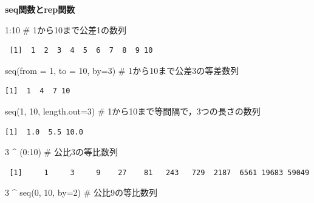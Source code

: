 \documentclass[
  letterpaper,
  DIV=11,
  numbers=noendperiod]{scrreprt}
\newenvironment{Shaded}{\begin{snugshade}}{\end{snugshade}}
\newcommand{\AttributeTok}[1]{\textcolor[rgb]{0.40,0.45,0.13}{#1}}
\newcommand{\CommentTok}[1]{\textcolor[rgb]{0.37,0.37,0.37}{#1}}
\newcommand{\DecValTok}[1]{\textcolor[rgb]{0.68,0.00,0.00}{#1}}
\newcommand{\FunctionTok}[1]{\textcolor[rgb]{0.28,0.35,0.67}{#1}}
\newcommand{\NormalTok}[1]{\textcolor[rgb]{0.00,0.23,0.31}{#1}}
\newcommand{\SpecialCharTok}[1]{\textcolor[rgb]{0.37,0.37,0.37}{#1}}
\begin{document}
\textbf{seq関数とrep関数}

\begin{Shaded}
\begin{Highlighting}[]
\DecValTok{1}\SpecialCharTok{:}\DecValTok{10} \CommentTok{\# 1から10まで公差1の数列}
\end{Highlighting}
\end{Shaded}

\begin{verbatim}
 [1]  1  2  3  4  5  6  7  8  9 10
\end{verbatim}

\begin{Shaded}
\begin{Highlighting}[]
\FunctionTok{seq}\NormalTok{(}\AttributeTok{from =} \DecValTok{1}\NormalTok{, }\AttributeTok{to =} \DecValTok{10}\NormalTok{, }\AttributeTok{by=}\DecValTok{3}\NormalTok{) }\CommentTok{\# 1から10まで公差3の等差数列}
\end{Highlighting}
\end{Shaded}

\begin{verbatim}
[1]  1  4  7 10
\end{verbatim}

\begin{Shaded}
\begin{Highlighting}[]
\FunctionTok{seq}\NormalTok{(}\DecValTok{1}\NormalTok{, }\DecValTok{10}\NormalTok{, }\AttributeTok{length.out=}\DecValTok{3}\NormalTok{) }\CommentTok{\# 1から10まで等間隔で，3つの長さの数列}
\end{Highlighting}
\end{Shaded}

\begin{verbatim}
[1]  1.0  5.5 10.0
\end{verbatim}

\begin{Shaded}
\begin{Highlighting}[]
\DecValTok{3} \SpecialCharTok{\^{}}\NormalTok{ (}\DecValTok{0}\SpecialCharTok{:}\DecValTok{10}\NormalTok{) }\CommentTok{\# 公比3の等比数列}
\end{Highlighting}
\end{Shaded}

\begin{verbatim}
 [1]     1     3     9    27    81   243   729  2187  6561 19683 59049
\end{verbatim}

\begin{Shaded}
\begin{Highlighting}[]
\DecValTok{3} \SpecialCharTok{\^{}} \FunctionTok{seq}\NormalTok{(}\DecValTok{0}\NormalTok{, }\DecValTok{10}\NormalTok{, }\AttributeTok{by=}\DecValTok{2}\NormalTok{) }\CommentTok{\# 公比9の等比数列}
\end{Highlighting}
\end{Shaded}
\end{document}
